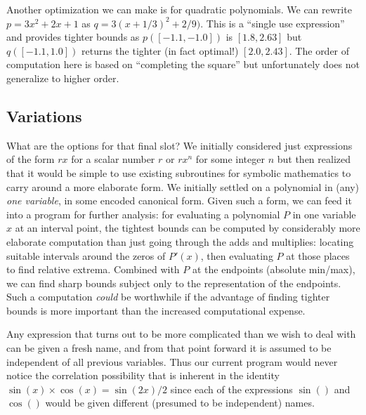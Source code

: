 \documentclass{article}
\begin{document}
Another optimization we can make is for quadratic polynomials. We can
rewrite $p=3x^2+2x+1$ as $q=3(x+1/3)^2+2/9)$. This is a ``single use
expression'' and provides tighter bounds as $p([-1.1,-1.0])$ is
$[1.8,2.63]$ but $q([-1.1,1.0])$ returns the tighter (in fact optimal!) $[2.0,
2.43].$ The order of computation here is based on ``completing the square''
but unfortunately does not generalize to higher order.
\subsection{Variations}
What are the options for that final slot?  We initially considered
just expressions of the form $r x$ for a scalar number $r$ or $rx^n$
for some integer $n$ but then realized that it would be simple to use
existing subroutines for symbolic mathematics to carry around a more
elaborate form.  We initially settled on a polynomial in (any) {\em one
variable}, in some encoded canonical form. {Given such a form, we can
feed it into a program for further analysis: for evaluating a
polynomial $P$ in one variable $x$ at an interval point, the tightest
bounds can be computed by considerably more elaborate computation than
just going through the adds and multiplies: locating suitable
intervals around the zeros of $P'(x)$, then evaluating $P$ at those
places to find relative extrema. Combined with $P$ at the endpoints
(absolute min/max), we can find sharp bounds subject only to the
representation of the endpoints.  Such a computation {\em could} be
worthwhile if the advantage of finding tighter bounds is more
important than the increased computational expense.}

Any expression that turns out to be more complicated than we wish to
deal with can be given a fresh name, and from that point forward it is
assumed to be independent of all previous variables.  Thus our current
program would never notice the correlation possibility that is
inherent in the identity $\sin(x) \times \cos(x) = \sin(2 x)/2$ since
each of the expressions $\sin()$ and $\cos()$ would be given different
(presumed to be independent) names.
\medskip
\end{document}
